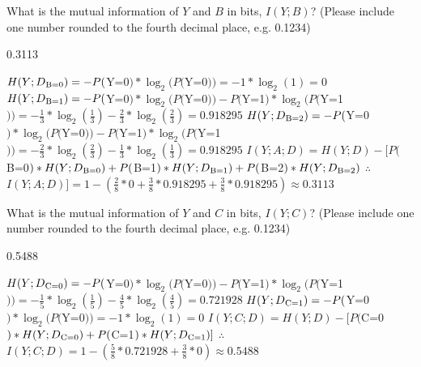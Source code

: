 \documentclass[11pt,addpoints,answers]{exam}
\begin{document}
\begin{questions}
\begin{your_solution}[title=Work,height=5cm,width=12cm]
    \end{your_solution}
    
    
    

    \question[1] What is the mutual information of $Y$ and $B$ in bits, $I(Y; B)$?
    (Please include one number rounded to the fourth decimal place, e.g. 0.1234)
    
    \begin{your_solution}[title=$I(Y;B)$,height=2cm,width=3cm]
    0.3113    
    \end{your_solution}
    \begin{your_solution}[title=Work,height=5cm,width=12cm]
    $H(Y;D\textsubscript{B=0}) = - P($Y=0$) * \log_{2}(P($Y=0$)) = - 1*\log_2(1) = 0$\newline
    $H(Y;D\textsubscript{B=1}) = - P($Y=0$) * \log_{2}(P($Y=0$)) - P($Y=1$) * \log_{2}(P($Y=1$)) = - \frac{1}{3}*\log_2(\frac{1}{3}) - \frac{2}{3}*\log_2(\frac{2}{3}) = 0.918295$\newline
    $H(Y;D\textsubscript{B=2}) = - P($Y=0$) * \log_{2}(P($Y=0$)) - P($Y=1$) * \log_{2}(P($Y=1$)) = - \frac{2}{3}*\log_2(\frac{2}{3}) - \frac{1}{3}*\log_2(\frac{1}{3}) = 0.918295$\newline
    $I(Y;A;D) = H(Y;D) - [ P($B=0$)*H(Y;D\textsubscript{B=0}) + P($B=1$)*H(Y;D\textsubscript{B=1}) + P($B=2$)*H(Y;D\textsubscript{B=2})$\newline
    $\therefore$ $I(Y;A;D)] = 1 - (\frac{2}{8}*0 + \frac{3}{8}*0.918295 + \frac{3}{8}*0.918295) \approx 0.3113$
    
    \end{your_solution}
    
    \question[1] What is the mutual information of $Y$ and $C$ in bits, $I(Y; C)$?
    (Please include one number rounded to the fourth decimal place, e.g. 0.1234)
    
    \begin{your_solution}[title=$I(Y;C)$,height=2cm,width=3cm]
    0.5488
    \end{your_solution}
    \begin{your_solution}[title=Work,height=5cm,width=12cm]
    
    $H(Y;D\textsubscript{C=0}) = - P($Y=0$) * \log_{2}(P($Y=0$)) - P($Y=1$) * \log_{2}(P($Y=1$)) = - \frac{1}{5}*\log_2(\frac{1}{5}) - \frac{4}{5}*\log_2(\frac{4}{5}) = 0.721928$\newline
    $H(Y;D\textsubscript{C=1}) = - P($Y=0$) * \log_{2}(P($Y=0$)) = - 1*\log_2(1) = 0$\newline\newline
    $I(Y;C;D) = H(Y;D) - [P($C=0$)*H(Y;D\textsubscript{C=0}) + P($C=1$)*H(Y;D\textsubscript{C=1})]$\newline
    $\therefore$ $I(Y;C;D) = 1 - (\frac{5}{8} * 0.721928 + \frac{3}{8} * 0) \approx 0.5488$
    

\end{your_solution}
\end{questions}
\end{document}
